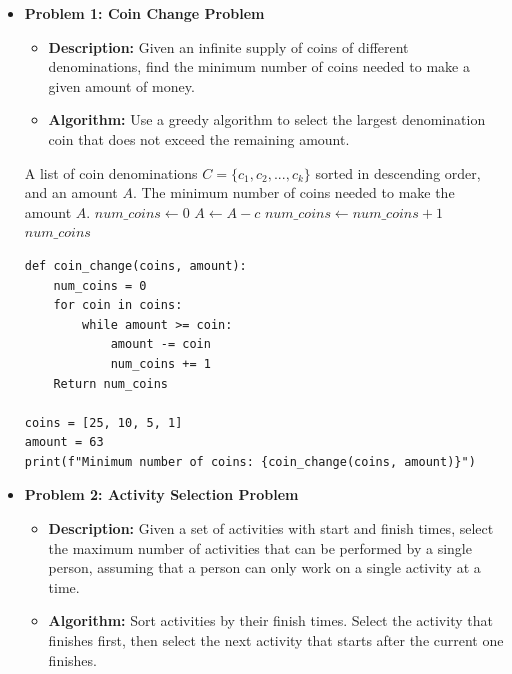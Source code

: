 \documentclass[12pt]{book} %
\begin{document}
\begin{itemize}
    \item \textbf{Problem 1: Coin Change Problem}
    \begin{itemize}
        \item \textbf{Description:} Given an infinite supply of coins of different denominations, find the minimum number of coins needed to make a given amount of money.
        \item \textbf{Algorithm:} Use a greedy algorithm to select the largest denomination coin that does not exceed the remaining amount.
    \end{itemize}
    
    \begin{algorithm}
    \caption{Greedy Coin Change Algorithm}
    \begin{algorithmic}[1]
    \Require A list of coin denominations $C = \{c_1, c_2, ..., c_k\}$ sorted in descending order, and an amount $A$.
    \Ensure The minimum number of coins needed to make the amount $A$.
    \State $num\_coins \leftarrow 0$
            \State $A \leftarrow A - c$
            \State $num\_coins \leftarrow num\_coins + 1$
        \EndWhile
    \EndFor
    \Return $num\_coins$
    \end{algorithmic}
    \end{algorithm}

    \FloatBarrier
    \begin{lstlisting}
def coin_change(coins, amount):
    num_coins = 0
    for coin in coins:
        while amount >= coin:
            amount -= coin
            num_coins += 1
    Return num_coins

coins = [25, 10, 5, 1]
amount = 63
print(f"Minimum number of coins: {coin_change(coins, amount)}")
    \end{lstlisting}
    \FloatBarrier

    \item \textbf{Problem 2: Activity Selection Problem}
    \begin{itemize}
        \item \textbf{Description:} Given a set of activities with start and finish times, select the maximum number of activities that can be performed by a single person, assuming that a person can only work on a single activity at a time.
        \item \textbf{Algorithm:} Sort activities by their finish times. Select the activity that finishes first, then select the next activity that starts after the current one finishes.
    \end{itemize}


\end{itemize}
\end{document}
